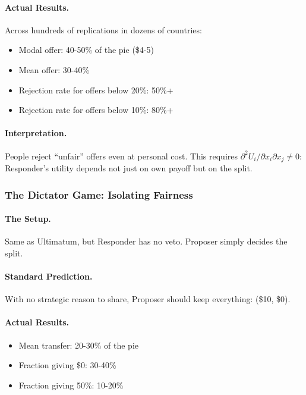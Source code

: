 \paragraph{Actual Results.}
Across hundreds of replications in dozens of countries:
\begin{itemize}
  \item Modal offer: 40-50\% of the pie (\$4-5)
  \item Mean offer: 30-40\%
  \item Rejection rate for offers below 20\%: 50\%+
  \item Rejection rate for offers below 10\%: 80\%+
\end{itemize}

\paragraph{Interpretation.}
People reject ``unfair'' offers even at personal cost.
This requires $\partial^2 U_i / \partial x_i \partial x_j \neq 0$:
Responder's utility depends not just on own payoff but on the split.

\subsubsection{The Dictator Game: Isolating Fairness}

\paragraph{The Setup.}
Same as Ultimatum, but Responder has no veto. Proposer simply decides the split.

\paragraph{Standard Prediction.}
With no strategic reason to share, Proposer should keep everything: (\$10, \$0).

\paragraph{Actual Results.}
\begin{itemize}
  \item Mean transfer: 20-30\% of the pie
  \item Fraction giving \$0: 30-40\%
  \item Fraction giving 50\%: 10-20\%
\end{itemize}

